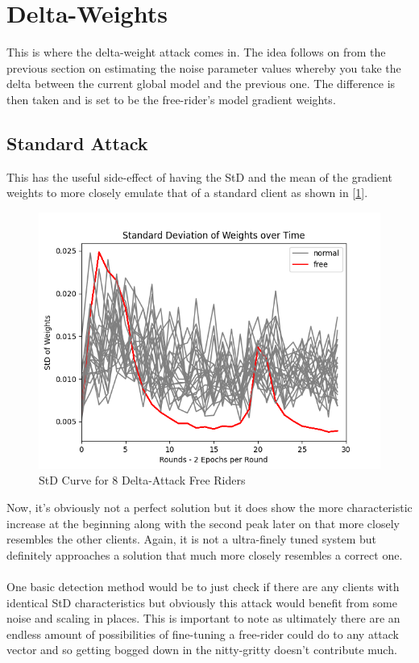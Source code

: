 \section{Delta-Weights}
This is where the delta-weight attack comes in.
The idea follows on from the previous section on estimating the noise parameter values whereby you take the delta between the current global model and the previous one.
The difference is then taken and is set to be the free-rider's model gradient weights.

\subsection{Standard Attack}

This has the useful side-effect of having the StD and the mean of the gradient weights to more closely emulate that of a standard client as shown in [\ref{fig:std_delta}].
\begin{figure}[htbp]
	\centering
    \includegraphics[scale=0.5]{free_riders/graphs/delta8.png}
	\caption{StD Curve for 8 Delta-Attack Free Riders}
	\label{fig:std_delta}
\end{figure}

Now, it's obviously not a perfect solution but it does show the more characteristic increase at the beginning along with the second peak later on that more closely resembles the other clients.
Again, it is not a ultra-finely tuned system but definitely approaches a solution that much more closely resembles a correct one.
\\ \\ 
One basic detection method would be to just check if there are any clients with identical StD characteristics but obviously this attack would benefit from some noise and scaling in places.
This is important to note as ultimately there are an endless amount of possibilities of fine-tuning a free-rider could do to any attack vector and so getting bogged down in the nitty-gritty doesn't contribute much.


